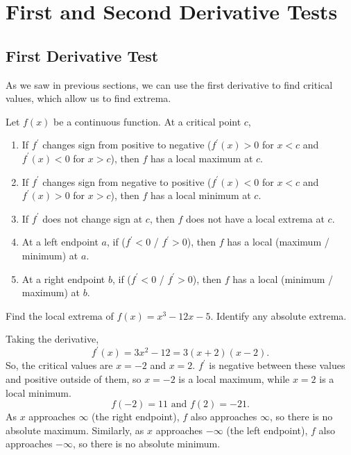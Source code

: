 \section{First and Second Derivative Tests}
\subsection{First Derivative Test}
As we saw in previous sections, we can use the first derivative to find critical values, which allow us to find extrema.
\begin{theorem}
	Let $f(x)$ be a continuous function.
	At a critical point $c$,
	\begin{enumerate}
		\item If $f^\prime$ changes sign from positive to negative ($f^\prime(x) > 0$ for $x < c$ and $f^\prime(x) < 0$ for $x > c$), then $f$ has a local maximum at $c$.
		\item If $f^\prime$ changes sign from negative to positive ($f^\prime(x) < 0$ for $x < c$ and $f^\prime(x) > 0$ for $x > c$), then $f$ has a local minimum at $c$.
		\item If $f^\prime$ does not change sign at $c$, then $f$ does not have a local extrema at $c$.
		\item At a left endpoint $a$, if ($f^\prime < 0$ / $f^\prime > 0$), then $f$ has a local (maximum / minimum) at $a$.
		\item At a right endpoint $b$, if ($f^\prime < 0$ / $f^\prime > 0$), then $f$ has a local (minimum / maximum) at $b$.
	\end{enumerate}
\end{theorem}

\begin{example}
	Find the local extrema of $f(x) = x^3 - 12x - 5$.
	Identify any absolute extrema.
\end{example}
Taking the derivative,
\begin{equation*}
	f^\prime(x) = 3x^2 - 12 = 3(x+2)(x-2).
\end{equation*}
\indent
So, the critical values are $x=-2$ and $x=2$.
$f^\prime$ is negative between these values and positive outside of them, so $x=-2$ is a local maximum, while $x=2$ is a local minimum.
\begin{equation*}
	f(-2) = 11 \text{ and } f(2) = -21.
\end{equation*}
\indent
As $x$ approaches $\infty$ (the right endpoint), $f$ also approaches $\infty$, so there is no absolute maximum.
Similarly, as $x$ approaches $-\infty$ (the left endpoint), $f$ also approaches $-\infty$, so there is no absolute minimum.

